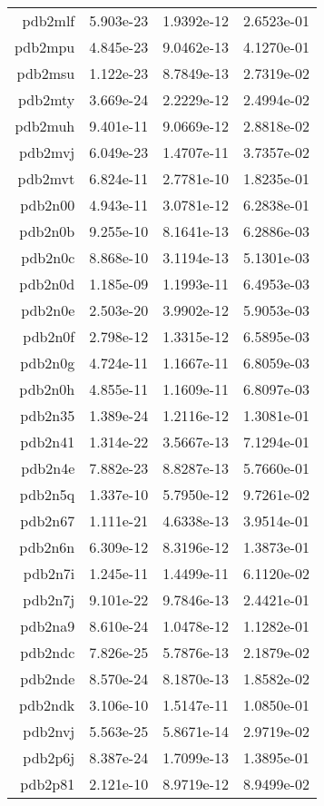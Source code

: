 \begin{xltabular}{\textwidth}{||rS[table-format=1.3e+2]S[table-format=1.4e+2]S[table-format=1.4e+2]||}
pdb2mlf & 5.903e-23 & 1.9392e-12 & 2.6523e-01 \\
pdb2mpu & 4.845e-23 & 9.0462e-13 & 4.1270e-01 \\
pdb2msu & 1.122e-23 & 8.7849e-13 & 2.7319e-02 \\
pdb2mty & 3.669e-24 & 2.2229e-12 & 2.4994e-02 \\
pdb2muh & 9.401e-11 & 9.0669e-12 & 2.8818e-02 \\
pdb2mvj & 6.049e-23 & 1.4707e-11 & 3.7357e-02 \\
pdb2mvt & 6.824e-11 & 2.7781e-10 & 1.8235e-01 \\
pdb2n00 & 4.943e-11 & 3.0781e-12 & 6.2838e-01 \\
pdb2n0b & 9.255e-10 & 8.1641e-13 & 6.2886e-03 \\
pdb2n0c & 8.868e-10 & 3.1194e-13 & 5.1301e-03 \\
pdb2n0d & 1.185e-09 & 1.1993e-11 & 6.4953e-03 \\
pdb2n0e & 2.503e-20 & 3.9902e-12 & 5.9053e-03 \\
pdb2n0f & 2.798e-12 & 1.3315e-12 & 6.5895e-03 \\
pdb2n0g & 4.724e-11 & 1.1667e-11 & 6.8059e-03 \\
pdb2n0h & 4.855e-11 & 1.1609e-11 & 6.8097e-03 \\
pdb2n35 & 1.389e-24 & 1.2116e-12 & 1.3081e-01 \\
pdb2n41 & 1.314e-22 & 3.5667e-13 & 7.1294e-01 \\
pdb2n4e & 7.882e-23 & 8.8287e-13 & 5.7660e-01 \\
pdb2n5q & 1.337e-10 & 5.7950e-12 & 9.7261e-02 \\
pdb2n67 & 1.111e-21 & 4.6338e-13 & 3.9514e-01 \\
pdb2n6n & 6.309e-12 & 8.3196e-12 & 1.3873e-01 \\
pdb2n7i & 1.245e-11 & 1.4499e-11 & 6.1120e-02 \\
pdb2n7j & 9.101e-22 & 9.7846e-13 & 2.4421e-01 \\
pdb2na9 & 8.610e-24 & 1.0478e-12 & 1.1282e-01 \\
pdb2ndc & 7.826e-25 & 5.7876e-13 & 2.1879e-02 \\
pdb2nde & 8.570e-24 & 8.1870e-13 & 1.8582e-02 \\
pdb2ndk & 3.106e-10 & 1.5147e-11 & 1.0850e-01 \\
pdb2nvj & 5.563e-25 & 5.8671e-14 & 2.9719e-02 \\
pdb2p6j & 8.387e-24 & 1.7099e-13 & 1.3895e-01 \\
pdb2p81 & 2.121e-10 & 8.9719e-12 & 8.9499e-02 \\

\end{xltabular}
